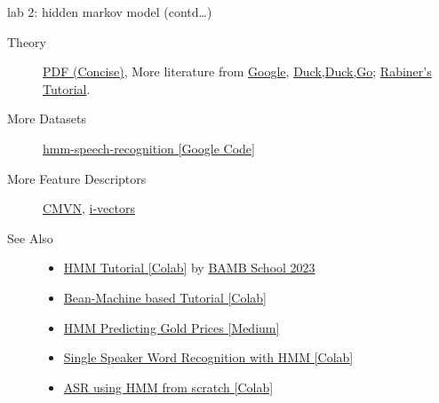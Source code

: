 \documentclass[aspectratio=169,xcolor={dvipsnames,svgnames}]{beamer}
\begin{document}
\begin{frame}[label={sec:orgdeeff8f}]{lab 2: hidden markov model (contd…)}
\begin{description}
\item[{Theory}] \href{https://web.stanford.edu/\~jurafsky/slp3/A.pdf}{PDF (Concise)}, More literature from \href{https://www.google.com/search?hl=en\&q=hidden\%20markov\%20model\%20filetype\%3Apdf}{Google},
\href{https://duckduckgo.com/?q=hidden+markov+model+filetype\%3Apdf\&ia=web}{Duck,Duck,Go}; \href{https://scholar.google.com/scholar?q=A\%20tutorial\%20on\%20hidden\%20Markov\%20models\%20and\%20selected\%20applications\%20in\%20speech\%20recognition}{Rabiner's Tutorial}.
\item[{More Datasets}] \href{https://code.google.com/archive/p/hmm-speech-recognition/downloads}{hmm-speech-recognition [Google Code]​}
\item[{More Feature Descriptors}] \href{https://en.wikipedia.org/wiki/Cepstral\_mean\_and\_variance\_normalization}{CMVN}, \href{http://people.csail.mit.edu/sshum/talks/ivector\_tutorial\_interspeech\_27Aug2011.pdf}{i-vectors}
\item[{See Also}] \begin{itemize}
\item \href{https://colab.research.google.com/github/bambschool/BAMB2023/blob/main/6-latent\_variable\_models/hidden-markov-models.ipynb}{HMM Tutorial [Colab]​} by \href{https://github.com/bambschool/BAMB2023}{BAMB School 2023}
\item \href{https://colab.research.google.com/github/facebookresearch/beanmachine/blob/main/tutorials/Hidden\_Markov\_model.ipynb\#scrollTo=vwxlljQwXOxg}{Bean-Machine based Tutorial [Colab]​}
\item \href{https://medium.com/@natsunoyuki/hidden-markov-models-with-python-c026f778dfa7}{HMM Predicting Gold Prices [Medium]​}
\item \href{https://colab.research.google.com/github/kastnerkyle/kastnerkyle.github.io/blob/master/posts/single-speaker-word-recognition-with-hidden-markov-models/single-speaker-word-recognition-with-hidden-markov-models.ipynb}{Single Speaker Word Recognition with HMM [Colab]​}
\item \href{https://colab.research.google.com/drive/1aFgzrUv3udM\_gNJNUoLaHIm78QHtxdIz?usp=sharing}{ASR using HMM from scratch [Colab]​}
\end{itemize}
\end{description}
\end{frame}
\end{document}
